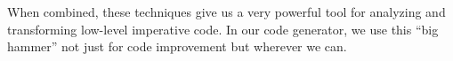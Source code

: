\documentclass[blockstyle,preprint,nocopyrightspace]{sigplanconf}
\begin{document}
When combined, these techniques give us a very powerful tool for
analyzing and transforming low-level imperative code.
In our code generator, 
we use this ``big hammer'' not just for code improvement but wherever
we can.


\makeatother

\providecommand\includeftpref{\relax} %
 

\end{document}

